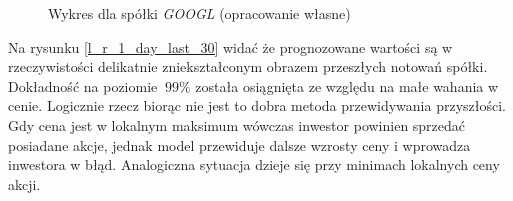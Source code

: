 \documentclass[a4paper, twoside, 11pt, openright]{article}
\begin{document}
\begin{figure}[H]%
\centering
{}%
\qquad
{}%
\caption{Wykres dla spółki \textit{GOOGL} (opracowanie własne)}
\label{linear_regression_1}
\end{figure}


Na rysunku \ref{l_r_1_day_last_30} widać że prognozowane wartości są w rzeczywistości delikatnie zniekształconym obrazem przeszłych notowań spółki. Dokładność na poziomie $~99\%$ została osiągnięta ze względu na małe wahania w cenie. Logicznie rzecz biorąc nie jest to dobra metoda przewidywania przyszłości. Gdy cena jest w lokalnym maksimum wówczas inwestor powinien sprzedać posiadane akcje, jednak model przewiduje dalsze wzrosty ceny i wprowadza inwestora w błąd. Analogiczna sytuacja dzieje się przy minimach lokalnych ceny akcji. 
\end{document}
